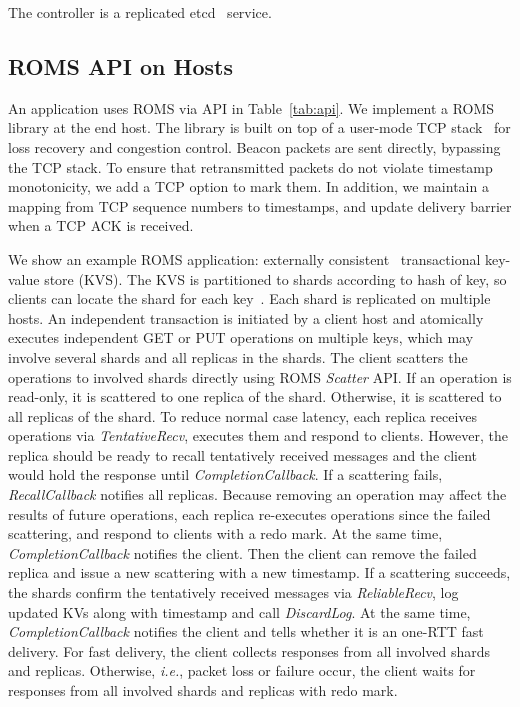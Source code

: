 The controller is a replicated etcd~\cite{etcd} service.


\iffalse
\subsection{ROMS API on Hosts}
\label{sec:api}

An application uses ROMS via API in Table~\ref{tab:api}.
We implement a ROMS library at the end host. The library is built on top of a user-mode TCP stack~\cite{libvma,dunkels2001design} for loss recovery and congestion control. Beacon packets are sent directly, bypassing the TCP stack. To ensure that retransmitted packets do not violate timestamp monotonicity, we add a TCP option to mark them. In addition, we maintain a mapping from TCP sequence numbers to timestamps, and update delivery barrier when a TCP ACK is received.

We show an example ROMS application: externally consistent~\cite{corbett2013spanner} transactional key-value store (KVS).
The KVS is partitioned to shards according to hash of key, so clients can locate the shard for each key~\cite{nishtala2013scaling,eris}.
Each shard is replicated on multiple hosts.
An independent transaction is initiated by a client host and atomically executes independent GET or PUT operations on multiple keys, which may involve several shards and all replicas in the shards.
The client scatters the operations to involved shards directly using ROMS \emph{Scatter} API.
If an operation is read-only, it is scattered to one replica of the shard. Otherwise, it is scattered to all replicas of the shard.
To reduce normal case latency, each replica receives operations via \emph{TentativeRecv}, executes them and respond to clients.
However, the replica should be ready to recall tentatively received messages and the client would hold the response until \emph{CompletionCallback}.
If a scattering fails, \emph{RecallCallback} notifies all replicas.
Because removing an operation may affect the results of future operations, each replica re-executes operations since the failed scattering, and respond to clients with a redo mark.
At the same time, \emph{CompletionCallback} notifies the client. Then the client can remove the failed replica and issue a new scattering with a new timestamp.
If a scattering succeeds, the shards confirm the tentatively received messages via \emph{ReliableRecv}, log updated KVs along with timestamp and call \emph{DiscardLog}.
At the same time, \emph{CompletionCallback} notifies the client and tells whether it is an one-RTT fast delivery.
For fast delivery, the client collects responses from all involved shards and replicas.
Otherwise, \emph{i.e.}, packet loss or failure occur, the client waits for responses from all involved shards and replicas with redo mark.


